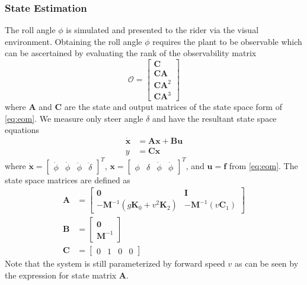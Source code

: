 \documentclass[11pt,a4paper,reqno]{amsart}
\newcommand{\mass}{\bm{M}}
\newcommand{\damping}{v \bm{C}_1}
\newcommand{\stiffness}{g \bm{K}_0 + v^2 \bm{K}_2}
\newcommand{\dstate}{\dot{\bm{x}}}
\newcommand{\state}{\bm{x}}
\newcommand{\sysInput}{\bm{u}}
\newcommand{\sysOutput}{y}
\newcommand{\stateMat}{\bm{A}}
\newcommand{\inputMat}{\bm{B}}
\newcommand{\outputMat}{\bm{C}}
\newcommand{\roll}{\phi}
\newcommand{\steer}{\delta}
\newcommand{\rollRate}{\dot{\phi}}
\newcommand{\steerRate}{\dot{\phi}}
\begin{document}
\subsubsection{State Estimation}
The roll angle $ \roll $ is simulated and presented to the rider via the visual environment.
Obtaining the roll angle $ \roll $ requires the plant to be observable which can be ascertained by evaluating the rank of
the observability matrix
\begin{equation}
    \bm{\mathcal{O}} = \begin{bmatrix} \outputMat \\ \outputMat\stateMat \\
                                       \outputMat\stateMat^2 \\ \outputMat\stateMat^3 \end{bmatrix}
\end{equation}
where $ \bm{A} $ and $ \bm{C} $ are the state and output matrices of the state space form of \autoref{eq:eom}.
We measure only steer angle $ \steer $ and have the resultant state space equations
\begin{equation}
\begin{aligned}
    \dstate &= \stateMat \state + \inputMat \sysInput \\
    \sysOutput &= \outputMat \state \label{eq:ss}
\end{aligned}
\end{equation}
where $ \dot{\bm{x}} = \begin{bmatrix} \rollRate & \steerRate & \ddot{\roll} & \ddot{\steer} \end{bmatrix}^T $,
$ \bm{x} = \begin{bmatrix} \roll & \steer& \rollRate & \steerRate \end{bmatrix}^T $,
and $ \bm{u} = \bm{f} $ from \autoref{eq:eom}.
The state space matrices are defined as
\begin{equation}
\begin{aligned}
    \stateMat &= \begin{bmatrix} \bm{0} & \bm{I} \\
                -\mass^{-1} (\stiffness) & -\mass^{-1} (\damping) \end{bmatrix} \\
    \inputMat &= \begin{bmatrix} \bm{0} \\ \mass^{-1} \end{bmatrix} \\
    \outputMat &= \begin{bmatrix} 0 & 1 & 0 & 0 \end{bmatrix}
\end{aligned}
\end{equation}
Note that the system is still parameterized by forward speed $ v $  as can be seen by the expression for
state matrix $ \stateMat $.
\end{document}
